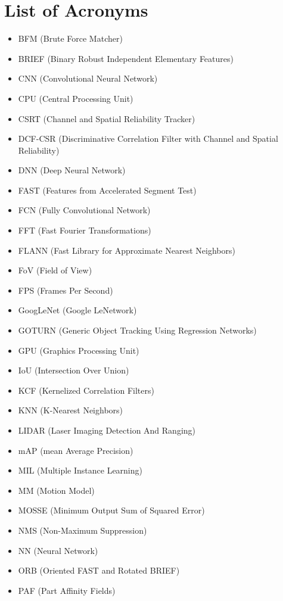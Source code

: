 \chapter*{List of Acronyms}
\begin{itemize}
	\item BFM (Brute Force Matcher)
	\item BRIEF (Binary Robust Independent Elementary Features)
	\item CNN (Convolutional Neural Network)
	\item CPU (Central Processing Unit)
	\item CSRT (Channel and Spatial Reliability Tracker)
	\item DCF-CSR (Discriminative Correlation Filter with Channel and Spatial Reliability)
	\item DNN (Deep Neural Network)
	\item FAST (Features from Accelerated Segment Test)
	\item FCN (Fully Convolutional Network)
	\item FFT (Fast Fourier Transformations)
	\item FLANN (Fast Library for Approximate Nearest Neighbors)
	\item FoV (Field of View)
	\item FPS (Frames Per Second)
	\item GoogLeNet (Google LeNetwork)
	\item GOTURN (Generic Object Tracking Using Regression Networks)
	\item GPU (Graphics Processing Unit)
	\item IoU (Intersection Over Union)
	\item KCF (Kernelized Correlation Filters)
	\item KNN (K-Nearest Neighbors)
	\item LIDAR (Laser Imaging Detection And Ranging)
	\item mAP (mean Average Precision)
	\item MIL (Multiple Instance Learning)
	\item MM (Motion Model)
	\item MOSSE (Minimum Output Sum of Squared Error)
	\item NMS (Non-Maximum Suppression)
	\item NN (Neural Network)
	\item ORB (Oriented FAST and Rotated BRIEF)
	\item PAF (Part Affinity Fields)

\end{itemize}
